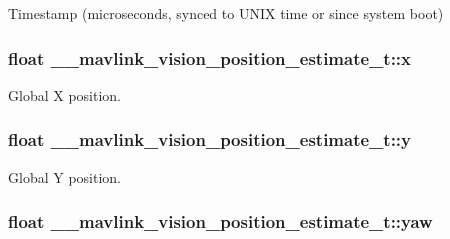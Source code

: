 Timestamp (microseconds, synced to U\+N\+I\+X time or since system boot) 

\hypertarget{struct____mavlink__vision__position__estimate__t_af418f4744f2e73a69c5d8fa2b66a83df}{
\subsubsection[{x}]{\setlength{\rightskip}{0pt plus 5cm}float \+\_\+\+\_\+mavlink\+\_\+vision\+\_\+position\+\_\+estimate\+\_\+t\+::x}}\label{struct____mavlink__vision__position__estimate__t_af418f4744f2e73a69c5d8fa2b66a83df}


Global X position. 

\hypertarget{struct____mavlink__vision__position__estimate__t_accc56a76ae057c7761c4d9024ea7f09b}{
\subsubsection[{y}]{\setlength{\rightskip}{0pt plus 5cm}float \+\_\+\+\_\+mavlink\+\_\+vision\+\_\+position\+\_\+estimate\+\_\+t\+::y}}\label{struct____mavlink__vision__position__estimate__t_accc56a76ae057c7761c4d9024ea7f09b}


Global Y position. 

\hypertarget{struct____mavlink__vision__position__estimate__t_a37749316a78f4f06f99fd36cd553f0a9}{
\subsubsection[{yaw}]{\setlength{\rightskip}{0pt plus 5cm}float \+\_\+\+\_\+mavlink\+\_\+vision\+\_\+position\+\_\+estimate\+\_\+t\+::yaw}}\label{struct____mavlink__vision__position__estimate__t_a37749316a78f4f06f99fd36cd553f0a9}


